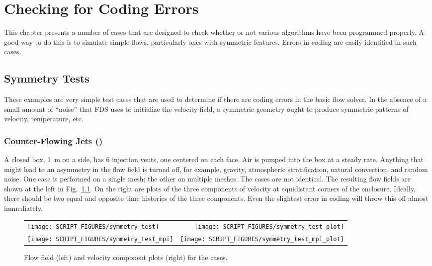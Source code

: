 \documentclass[11pt]{book}
\begin{document}
\chapter{Checking for Coding Errors}

This chapter presents a number of cases that are designed to check whether or not various algorithms have been programmed properly. A good way to do this is to simulate simple flows, particularly ones with symmetric features. Errors in coding are easily identified in such cases.

\section{Symmetry Tests}

These examples are very simple test cases that are used to determine if there are coding errors in the basic flow solver. In the absence of a small amount of ``noise'' that FDS uses to initialize the velocity field, a symmetric geometry ought to produce symmetric patterns of velocity, temperature, etc.

\subsection{Counter-Flowing Jets (\texorpdfstring{}{symmetry\_test})}
\label{symmetry_test}
\label{symmetry_test_mpi}

A closed box, 1~m on a side, has 6 injection vents, one centered on each face. Air is pumped into the box at a steady rate. Anything that might lead to an asymmetry in the flow field is turned off, for example, gravity, atmospheric stratification, natural convection, and random noise. One case is performed on a single mesh; the other on multiple meshes. The cases are not identical. The resulting flow fields are shown at the left in Fig.~\ref{symmetry_test_fig}. On the right are plots of the three components of velocity at equidistant corners of the enclosure. Ideally, there should be two equal and opposite time histories of the three components. Even the slightest error in coding will throw this off almost immediately.

\begin{figure}[!ht]
\begin{tabular*}{\textwidth}{lr}
\texttt{[image: SCRIPT\_FIGURES/symmetry\_test]} &
\texttt{[image: SCRIPT\_FIGURES/symmetry\_test\_plot]} \\
\texttt{[image: SCRIPT\_FIGURES/symmetry\_test\_mpi]} &
\texttt{[image: SCRIPT\_FIGURES/symmetry\_test\_mpi\_plot]}
\end{tabular*}
\caption[The  cases]{Flow field (left) and velocity component plots (right) for the  cases.}
\label{symmetry_test_fig}
\end{figure}
\end{document}
